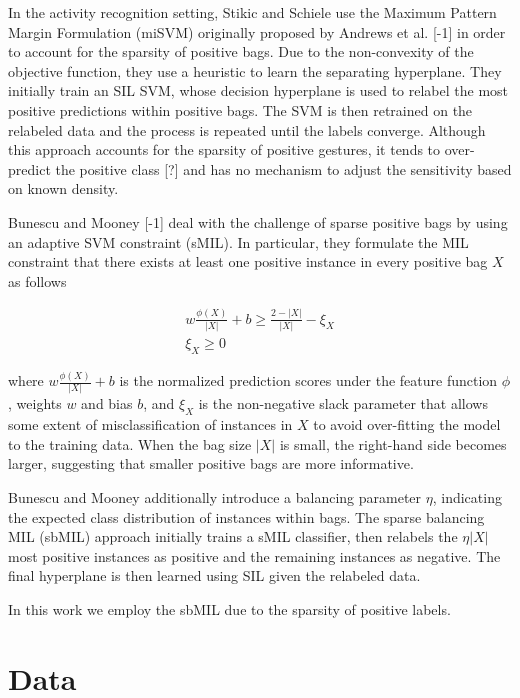 \documentclass{sigchi}
\begin{document}
In the activity recognition setting, Stikic and Schiele use the Maximum Pattern Margin Formulation (miSVM) originally proposed by Andrews et al. [-1] in order to account for the sparsity of positive bags. Due to the non-convexity of the objective function, they use a heuristic to learn the separating hyperplane. They initially train an SIL SVM, whose decision hyperplane is used to relabel the most positive predictions within positive bags. The SVM is then retrained on the relabeled data and the process is repeated until the labels converge. Although this approach accounts for the sparsity of positive gestures, it tends to over-predict the positive class [?] and has no mechanism to adjust the sensitivity based on known density.

Bunescu and Mooney [-1] deal with the challenge of sparse positive bags by using an adaptive SVM constraint (sMIL). In particular, they formulate the MIL constraint that there exists at least one positive instance in every positive bag $X$ as follows

\begin{align*}
	w \frac{\phi(X)}{\left| X \right|} + b \geq \frac{2 - \left| X \right|}{\left| X \right|} - \xi_X \\
	\xi_X \geq 0
\end{align*}

where $w \frac{\phi(X)}{\left| X \right|} + b$ is the normalized prediction scores under the feature function $\phi$, weights $w$ and bias $b$, and $\xi_X$ is the non-negative slack parameter that allows some extent of misclassification of instances in $X$ to avoid over-fitting the model to the training data. When the bag size $\left| X \right|$ is small, the right-hand side becomes larger, suggesting that smaller positive bags are more informative.

Bunescu and Mooney additionally introduce a balancing parameter $\eta$, indicating the expected class distribution of instances within bags. The sparse balancing MIL (sbMIL) approach initially trains a sMIL classifier, then relabels the $\eta \left| X \right|$ most positive instances as positive and the remaining instances as negative. The final hyperplane is then learned using SIL given the relabeled data.

In this work we employ the sbMIL due to the sparsity of positive labels.

\section{Data}
\end{document}
